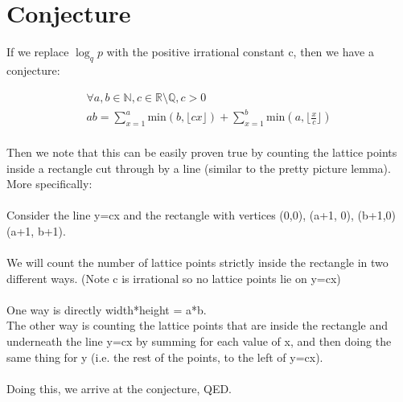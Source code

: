 \documentclass{article}
\begin{document}
\section{Conjecture} 
If we replace $\log_q p$ with the positive irrational constant c, then we have a conjecture:
\begin{tcolorbox}
\begin{equation*}
\begin{split}
    \forall a,b \in \mathbb{N}, c \in \mathbb{R} \setminus \mathbb{Q}, c>0\\
    ab = \sum_{x=1}^a \text{min}(b, \big\lfloor cx\big\rfloor) + \sum_{x=1}^b \text{min}(a, \big\lfloor \frac{x}{c} \big\rfloor)\\
\end{split}
\end{equation*}
\end{tcolorbox}

Then we note that this can be easily proven true by counting the lattice points inside a rectangle cut through by a line (similar to the pretty picture lemma). More specifically:\\\\
Consider the line y=cx and the rectangle with vertices (0,0), (a+1, 0), (b+1,0) (a+1, b+1).\\\\
We will count the number of lattice points strictly inside the rectangle in two different ways. (Note c is irrational so no lattice points lie on y=cx)\\\\
One way is directly width*height = a*b.\\
The other way is counting the lattice points that are inside the rectangle and underneath the line y=cx by summing for each value of x, and then doing the same thing for y (i.e. the rest of the points, to the left of y=cx).\\\\
Doing this, we arrive at the conjecture, QED.
\end{document}
